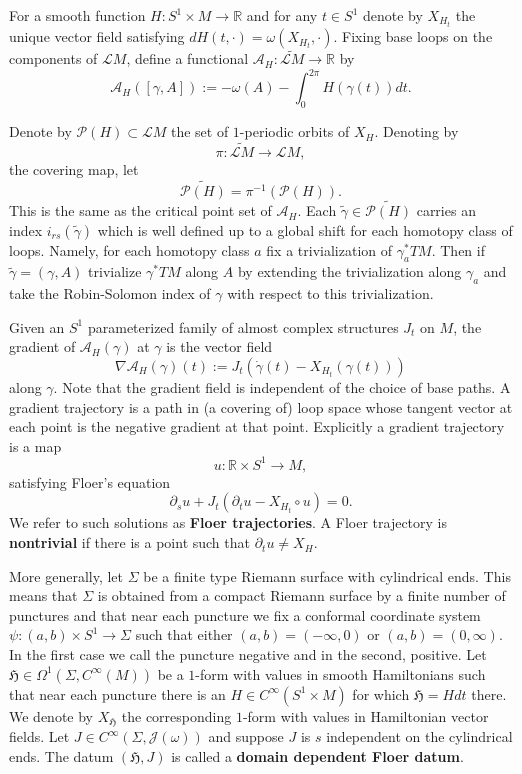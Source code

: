 \documentclass[11pt]{amsart}
\newcommand{\R}{\mathbb{R}}
\theoremstyle{definition}
\theoremstyle{remark}
\begin{document}
For a smooth function $H:S^1\times M\to \R$ and for any $t\in S^1$ denote by $X_{H_t}$ the unique vector field satisfying $dH(t,\cdot)=\omega(X_{H_t},\cdot).$
Fixing base loops on the components of $\mathcal{L}M$, define a functional $\mathcal{A}_H:\widetilde{\mathcal{L}M}\to \R$ by
\[
\mathcal{A}_{H}([\gamma,A]):=-\omega(A)-\int_0^{2\pi}H(\gamma(t))dt.
\]

Denote by $\mathcal{P}(H)\subset\mathcal{L}M$ the set of $1$-periodic orbits of $X_H$. Denoting by
\[
\pi:\widetilde{\mathcal{L}M}\to\mathcal{L}M,
\]
the covering map, let
\[
\widetilde{\mathcal{P}(H)}=\pi^{-1}(\mathcal{P}(H)).
\]
This is the same as the critical point set of $\mathcal{A}_H$. Each $\tilde{\gamma}\in \widetilde{\mathcal{P}(H)}$ carries an index $i_{rs}(\tilde{\gamma})$ which is well defined up to a global shift for each homotopy class of loops. Namely, for each homotopy class $a$ fix  a trivialization of $\gamma_a^*TM$. Then if $\tilde{\gamma}=(\gamma,A)$ trivialize $\gamma^*TM$ along $A$ by extending the trivialization along $\gamma_a$ and take the Robin-Solomon index of $\gamma$ with respect to this trivialization.

Given an $S^1$ parameterized family of almost complex structures $J_t$ on $M$, the gradient of $\mathcal{A}_{H}(\gamma)$ at $\gamma$ is the vector field
\[
\nabla\mathcal{A}_{H}(\gamma)(t):=J_t(\dot{\gamma}(t)-X_{H_t}(\gamma(t)))
\]
along $\gamma$. Note that the gradient field is independent of the choice of base paths.  A gradient trajectory is a path in (a covering of) loop space whose tangent vector at each point is the negative gradient at that point. Explicitly a gradient trajectory is a map
\[
u:\R\times S^1\to M,
\]
satisfying Floer's equation
\begin{equation}\label{eqFloTranInv}
\partial_su+J_t(\partial_tu-X_{H_t}\circ u)=0.
\end{equation}
We refer to such solutions as \textbf{Floer trajectories}. A Floer trajectory is \textbf{nontrivial} if there is a point such that $\partial_tu\neq X_H$.

More generally, let $\Sigma$ be a finite type Riemann surface with cylindrical ends. This means that $\Sigma$ is obtained from a compact Riemann surface by a finite number of punctures and that near each puncture we fix a conformal coordinate system $\psi:(a,b)\times S^1\to\Sigma$ such that either $(a,b)=(-\infty,0)$ or $(a,b)=(0,\infty)$. In the first case we call the puncture negative and in the second, positive. Let $\mathfrak{H}\in\Omega^1(\Sigma,C^{\infty}(M))$ be a $1$-form with values in smooth Hamiltonians such that near each puncture there is an $H\in C^{\infty}(S^1\times M)$ for which $\mathfrak{H}=Hdt$ there. We denote by $X_\mathfrak{H}$ the corresponding $1$-form with values in Hamiltonian vector fields. Let $J\in C^{\infty}(\Sigma,\mathcal{J}(\omega))$ and suppose $J$ is $s$ independent on the cylindrical ends. The datum $(\mathfrak{H},J)$ is called a \textbf{domain dependent Floer datum}.
\end{document}
